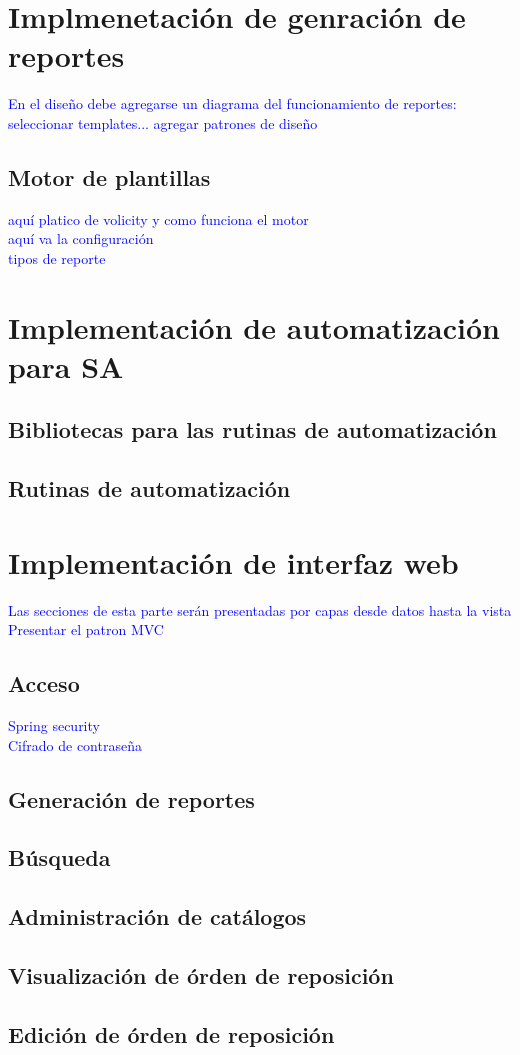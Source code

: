 \section{Implmenetación de genración de reportes}

\textcolor{blue}{En el diseño debe agregarse un diagrama del funcionamiento de reportes: seleccionar templates... agregar patrones de diseño}\\
\subsection{Motor de plantillas}
\textcolor{blue}{aquí platico de volicity y como funciona el motor}\\
\textcolor{blue}{aquí va la configuración}\\
\textcolor{blue}{tipos de reporte}

\section{Implementación de automatización para SA}
\subsection{Bibliotecas para las rutinas de automatización}
\subsection{Rutinas de automatización}

\section{Implementación de interfaz web}
\textcolor{blue}{Las secciones de esta parte serán presentadas por capas desde datos hasta la vista}\\
\textcolor{blue}{Presentar el patron MVC}\\
\subsection{Acceso}
\textcolor{blue}{Spring security}\\
\textcolor{blue}{Cifrado de contraseña}\\
\subsection{Generación de reportes}
\subsection{Búsqueda}

\subsection{Administración de catálogos}

\subsection{Visualización de órden de reposición}

\subsection{Edición de órden de reposición}
